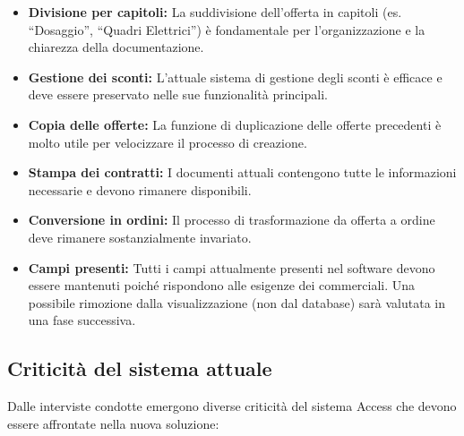 \documentclass[12pt, a4paper]{article}
\begin{document}
\begin{itemize}
    \item \textbf{Divisione per capitoli:} La suddivisione dell'offerta in capitoli (es. ``Dosaggio'', ``Quadri Elettrici'') è fondamentale per l'organizzazione e la chiarezza della documentazione.
    \item \textbf{Gestione dei sconti:} L'attuale sistema di gestione degli sconti è efficace e deve essere preservato nelle sue funzionalità principali.
    \item \textbf{Copia delle offerte:} La funzione di duplicazione delle offerte precedenti è molto utile per velocizzare il processo di creazione.
    \item \textbf{Stampa dei contratti:} I documenti attuali contengono tutte le informazioni necessarie e devono rimanere disponibili.
    \item \textbf{Conversione in ordini:} Il processo di trasformazione da offerta a ordine deve rimanere sostanzialmente invariato.
    \item \textbf{Campi presenti:} Tutti i campi attualmente presenti nel software devono essere mantenuti poiché rispondono alle esigenze dei commerciali. Una possibile rimozione dalla visualizzazione (non dal database) sarà valutata in una fase successiva.
\end{itemize}

\subsection{Criticità del sistema attuale}

Dalle interviste condotte emergono diverse criticità del sistema Access che devono essere affrontate nella nuova soluzione:
\end{document}
